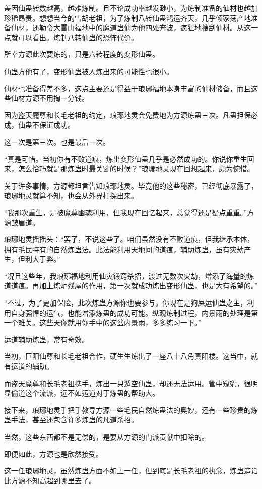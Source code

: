 \begin{this_body}
盖因仙蛊转数越高，越难炼制。且不论成功率越发渺小，为炼制准备的仙材也越加珍稀昂贵。想想当今的雪胡老祖，为了炼制八转仙蛊鸿运齐天，几乎倾家荡产地准备仙材，还勒令大雪山福地中的魔道蛊仙为他四处奔波，疯狂地搜刮仙材。从这一点就可以看出。炼制八转仙蛊的恐怖代价。

所幸方源此次要炼的，只是六转程度的变形仙蛊。

仙蛊方他有了，变形仙蛊被人炼出来的可能性也很小。

仙材也准备得差不多，这点主要还是得益于琅琊福地本身丰富的仙材储备，而且这些仙材方源不用掏一分钱。

因为盗天魔尊和长毛老祖的约定，琅琊地灵会免费地为方源炼蛊三次。凡蛊担保必成，仙蛊不保证成功。

这一次是第三次。也是最后一次。

“真是可惜。当初你有不败道痕，炼出变形仙蛊几乎是必然成功的。你说你重生回来，怎么恰巧就是那炼蛊时最关键的时候？”琅琊地灵现在回想起来，颇为惋惜。

关于许多事情，方源都坦言告知琅琊地灵。毕竟他的这些秘密，已经彻底暴露了，琅琊地灵就算不知，也会从外界打探出来。

“我那次重生，是被魔尊幽魂利用，但我现在回忆起来，总觉得还是疑点重重。”方源皱眉道。

琅琊地灵摇摇头：“罢了，不说这些了。咱们虽然没有不败道痕，但我继承本体，拥有毛民特有的自然炼蛊法。此法能利用天地间的道痕，辅助炼蛊，虽有灾劫产生，但利大于弊。”

“况且这些年，我琅琊福地利用仙灾锻窍杀招，渡过无数次灾劫，增添了海量的炼道道痕。再加上炼炉残屋的作用，第一次就成功炼出变形仙蛊，也是大有希望的。”

“不过，为了更加保险，此次炼蛊方源你也要参与。你现在是狗屎运仙蛊之主，利用自身强悍的运气，也能增添炼蛊的成功可能。纵观炼制过程，内景雨的处理是第一个难关。这些天你就用你手中的这盆内景雨，多多练习一下。”

运道辅助炼蛊，常有奇效。

当初，巨阳仙尊和长毛老祖合作，硬生生炼出了一座八十八角真阳楼。这当中，就有运道的辅助。

而盗天魔尊和长毛老祖携手，炼出一只遁空仙蛊，却还无法运用。管中窥豹，很明显偷道这个流派，远不如运道对于炼蛊的帮助大。

接下来，琅琊地灵手把手教导方源一些毛民自然炼蛊法的奥妙，还有一些珍贵的炼蛊手法，甚至还包含许多炼蛊的凡道杀招。

当然，这些东西都不是无偿的，是要从方源的门派贡献中扣除的。

即便如此，方源也是欣然接受。

这一任琅琊地灵，虽然炼蛊方面不如上一任，但到底是长毛老祖的执念，炼蛊造诣比方源不知高超到哪里去了。


\end{this_body}
